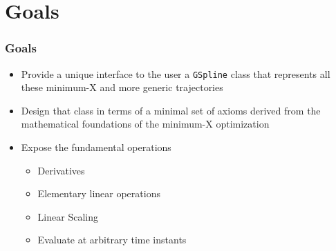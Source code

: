 \section{Goals}

\begin{frame}[t]
	\frametitle{Goals}

	{\fontsize{10}{5}
		\begin{itemize}
			\item Provide a unique interface to the user a \Verb|GSpline| class that represents all these minimum-X and more generic trajectories
			\item Design that class in terms of a minimal set of axioms derived from the mathematical foundations of the minimum-X optimization
			\item Expose the fundamental operations
			      \begin{itemize}
				      \item Derivatives
				      \item Elementary linear operations
				      \item Linear Scaling
				      \item Evaluate at arbitrary time instants
			      \end{itemize}
		\end{itemize}
	}
\end{frame}

